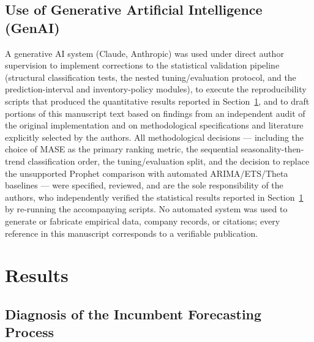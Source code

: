 \documentclass[forecasting,article,submit,pdftex,moreauthors]{Definitions/mdpi}
\begin{document}
\subsection{Use of Generative Artificial Intelligence (GenAI)}
\label{sec:genai}
A generative AI system (Claude, Anthropic) was used under direct author supervision to implement corrections to the statistical validation pipeline (structural classification tests, the nested tuning/evaluation protocol, and the prediction-interval and inventory-policy modules), to execute the reproducibility scripts that produced the quantitative results reported in Section~\ref{sec:results}, and to draft portions of this manuscript text based on findings from an independent audit of the original implementation and on methodological specifications and literature explicitly selected by the authors. All methodological decisions --- including the choice of MASE as the primary ranking metric, the sequential seasonality-then-trend classification order, the tuning/evaluation split, and the decision to replace the unsupported Prophet comparison with automated ARIMA/ETS/Theta baselines --- were specified, reviewed, and are the sole responsibility of the authors, who independently verified the statistical results reported in Section~\ref{sec:results} by re-running the accompanying scripts. No automated system was used to generate or fabricate empirical data, company records, or citations; every reference in this manuscript corresponds to a verifiable publication.

\section{Results}
\label{sec:results}

\subsection{Diagnosis of the Incumbent Forecasting Process}
\label{sec:diagnosis}
\end{document}
